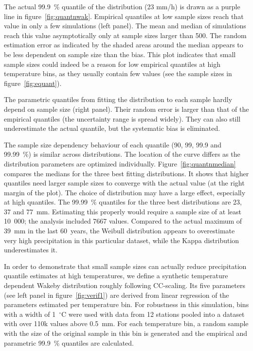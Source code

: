 \documentclass[a4paper]{article}
\begin{document}
\begin{multicols}{2}
The actual 99.9~\% quantile of the distribution (23 mm/h) is drawn as a purple line in figure~\ref{fig:quantnwak}.
Empirical quantiles at low sample sizes reach that value in only a few simulations (left panel). The mean and median of simulations reach this value asymptotically only at sample sizes larger than 500.
The random estimation error as indicated by the shaded areas around the median appears to be less dependent on sample size than the bias. 
This plot indicates that small sample sizes could indeed be a reason for low empirical quantiles at high temperature bins, as they usually contain few values (see the sample sizes in figure~\ref{fig:equant}).

The parametric quantiles from fitting the distribution to each sample hardly depend on sample size (right panel).
Their random error is larger than that of the empirical quantiles (the uncertainty range is spread widely).
They can also still underestimate the actual quantile, but the systematic bias is eliminated. 

The sample size dependency behaviour of each quantile (90, 99, 99.9 and 99.99~\%) is similar across distributions.
The location of the curve differs as the distribution parameters are optimized individually.
Figure~\ref{fig:quantnmedian} compares the medians for the three best fitting distributions.
It shows that higher quantiles need larger sample sizes to converge with the actual value (at the right margin of the plot).
The choice of distribution may have a large effect, especially at high quantiles. 
The 99.99~\% quantiles for the three best distributions are 23, 37 and 77~mm.
Estimating this properly would require a sample size of at least 10~000; the analysis included 7667 values.
Compared to the actual maximum of 39~mm in the last 60~years, the Weibull distribution appears to overestimate very high precipitation in this particular dataset, while the Kappa distribution underestimates it.

In order to demonstrate that small sample sizes can actually reduce precipitation quantile estimates at high temperatures, we define a synthetic temperature dependent Wakeby distribution roughly following CC-scaling.
Its five parameters (see left panel in figure~\ref{fig:verif1}) are derived from linear regression of the parameters estimated per temperature bin.
For robustness in this simulation, bins with a width of 1~$^{\circ}$C were used with data from 12 stations pooled into a dataset with over 110k values above 0.5~mm.
For each temperature bin, a random sample with the size of the original sample in this bin is generated and the empirical and parametric 99.9~\% quantiles are calculated.


\end{multicols}
\end{document}
